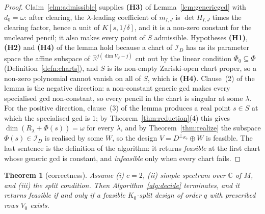 \documentclass[journal]{IEEEtran}
\theoremstyle{plainn}
\newtheorem{thm}{Theorem}
\theoremstyle{remark}
\begin{document}
\begin{proof}
Claim~\ref{clm:admissible} supplies \textbf{(H3)} of Lemma~\ref{lem:genericgcd} with $d_0=\omega$:
after clearing, the $\lambda$-leading coefficient of $m_{I,J}$ is $\det H_{I,J}$ times the clearing factor,
hence a unit of $K[s,1/\delta]$, and it is a non-zero constant for the uncleared pencil; it also makes
every point of $S$ admissible. Hypotheses \textbf{(H1)}, \textbf{(H2)} and \textbf{(H4)} of the lemma hold because a
chart of $\mathcal I_D$ has as its parameter space the affine subspace of $\mathbb R^{j(\dim V_\varphi-j)}$
cut out by the linear condition $\Phi_0\subseteq\Phi$ (Definition~\ref{defn:charts}), and $S$ is its
non-empty Zariski-open chart proper, so a non-zero polynomial cannot vanish on all of $S$, which is
\textbf{(H4)}.
Clause~(2) of the lemma is the
negative direction: a non-constant generic gcd makes every specialised gcd non-constant, so every pencil in
the chart is singular at some $\lambda$. For the positive direction, clause~(3) of the lemma produces a real
point $s\in S$ at which the specialised gcd is $1$; by Theorem~\ref{thm:reduction}(4) this gives
$\dim(R_\lambda+\Phi(s))=\omega$ for every $\lambda$, and by Theorem~\ref{thm:realize} the subspace
$\Phi(s)\in\mathcal I_D$ is realised by some $W$, so the design $V=D^{\perp_{K_0}}\oplus W$ is feasible. The
last sentence is the definition of the algorithm: it returns \emph{feasible} at the first chart whose generic
gcd is constant, and \emph{infeasible} only when every chart fails.
\end{proof}

\begin{thm}[correctness]\label{thm:correct}
Assume (i) $c=2$, (ii) simple spectrum over $\mathbb C$ of $M$, and (iii) the split condition. Then
Algorithm~\ref{alg:decide} terminates,
and it returns \emph{feasible} if and only if a feasible $K_0$-split design of order $q$ with prescribed rows
$V_0$ exists.
\end{thm}
\end{document}
